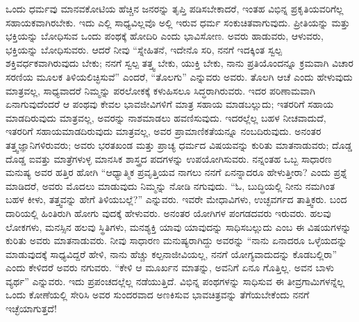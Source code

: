ಒಂದು ಧರ್ಮವು ಮಾನವಕೋಟಿಯ ಹೆಚ್ಚಿನ ಜನರನ್ನು ತೃಪ್ತಿ ಪಡಿಸಬೇಕಾದರೆ, ಇಂತಹ ವಿಭಿನ್ನ ಪ್ರಕೃತಿಯವರಿಗೆಲ್ಲ ಸಹಾಯಕವಾಗಿರಬೇಕು. ಇದು ಎಲ್ಲಿ ಸಾಧ್ಯವಿಲ್ಲವೊ ಅಲ್ಲಿ ಇರುವ ಧರ್ಮ ಸಂಕುಚಿತವಾಗುವುದು. ಪ್ರೀತಿಯನ್ನು ಮತ್ತು ಭಕ್ತಿಯನ್ನು ಬೋಧಿಸುವ ಒಂದು ಪಂಥಕ್ಕೆ ಹೋದಿರಿ ಎಂದು ಭಾವಿಸೋಣ. ಅವರು ಹಾಡುವರು, ಆಳುವರು, ಭಕ್ತಿಯನ್ನು ಬೋಧಿಸುವರು. ಆದರೆ ನೀವು “ಸ್ನೇಹಿತನೆ, ಇದೇನೊ ಸರಿ, ನನಗೆ ಇದಕ್ಕಿಂತ ಸ್ವಲ್ಪ ಶಕ್ತಿವರ್ಧಕವಾಗಿರುವುದು ಬೇಕು; ನನಗೆ ಸ್ವಲ್ಪ ತತ್ತ್ವ ಬೇಕು, ಯುಕ್ತಿ ಬೇಕು, ನಾನು ಪ್ರತಿಯೊಂದನ್ನೂ ಕ್ರಮವಾಗಿ ವಿಚಾರ ಸರಣಿಯ ಮೂಲಕ ತಿಳಿಯಲಿಚ್ಛಿಸುವೆ” ಎಂದರೆ, “ತೊಲಗು” ಎನ್ನುವರು ಅವರು. ತೊಲಗಿ ಆಚೆ ಎಂದು ಹೇಳುವುದು ಮಾತ್ರವಲ್ಲ, ಸಾಧ್ಯವಾದರೆ ನಿಮ್ಮನ್ನು ಪರಲೋಕಕ್ಕೆ ಕಳುಹಿಸಲೂ ಸಿದ್ಧರಾಗಿರುವರು. ಇದರ ಪರಿಣಾಮವಾಗಿ ಏನಾಗುವುದೆಂದರೆ ಆ ಪಂಥವು ಕೇವಲ ಭಾವಜೀವಿಗಳಿಗೆ ಮಾತ್ರ ಸಹಾಯ ಮಾಡಬಲ್ಲುದು; ಇತರರಿಗೆ ಸಹಾಯ ಮಾಡದಿರುವುದು ಮಾತ್ರವಲ್ಲ, ಅವರನ್ನು ನಾಶಮಾಡಲು ಹವಣಿಸುವುದು. ಇದರಲ್ಲೆಲ್ಲ ಬಹಳ ನೀಚವಾದುದೆ, ಇತರರಿಗೆ ಸಹಾಯಮಾಡದಿರುವುದು ಮಾತ್ರವಲ್ಲ, ಅವರ ಪ್ರಾಮಾಣಿಕತೆಯನ್ನೂ ನಂಬದಿರುವುದು. ಅನಂತರ ತತ್ತ್ವಜ್ಞಾನಿಗಳಿರುವರು; ಅವರು ಭರತಖಂಡ ಮತ್ತು ಪ್ರಾಚ್ಯ ಧರ್ಮದ ವಿಷಯವನ್ನು ಕುರಿತು ಮಾತನಾಡುವರು; ದೊಡ್ಡ ದೊಡ್ಡ ಐವತ್ತು ಮಾತ್ರೆಗಳುಳ್ಳ ಮಾನಸಿಕ ಶಾಸ್ತ್ರದ ಪದಗಳನ್ನು ಉಪಯೋಗಿಸುವರು. ನನ್ನಂತಹ ಒಬ್ಬ ಸಾಧಾರಣ ಮನುಷ್ಯ ಅವರ ಹತ್ತಿರ ಹೋಗಿ “ಆಧ್ಯಾತ್ಮಿಕ ಪ್ರವೃತ್ತಿಯವ ನಾಗಲು ನನಗೆ ಏನನ್ನಾದರೂ ಹೇಳುತ್ತೀರಾ? ಎಂದು ಪ್ರಶ್ನೆ ಮಾಡಿದರೆ, ಅವರು ಮೊದಲು ಮಾಡುವುದು ನಿಮ್ಮನ್ನು ನೋಡಿ ನಗುವುದು. “ಓ, ಬುದ್ಧಿಯಲ್ಲಿ ನೀನು ನಮಗಿಂತ ಬಹಳ ಕೀಳು, ತತ್ತ್ವವನ್ನು ಹೇಗೆ ತಿಳಿಯಬಲ್ಲೆ?” ಎನ್ನುವರು. ಇವರೇ ಮೇಧಾವಿಗಳು, ಉಚ್ಛವರ್ಗದ ತಾತ್ತ್ವಿಕರು. ಬಂದ ದಾರಿಯಲ್ಲಿ ಹಿಂತಿರುಗಿ ಹೋಗು ವುದಕ್ಕೆ ಹೇಳುವರು. ಅನಂತರ ಯೋಗಿಗಳ ಪಂಗಡದವರು ಇರುವರು. ಹಲವು ಲೋಕಗಳು, ಮನಸ್ಸಿನ ಹಲವು ಸ್ಥಿತಿಗಳು, ಮನಶ್ಯಕ್ತಿ ಯಾವು ಯಾವುದನ್ನು ಸಾಧಿಸಬಲ್ಲುದು ಎಂಬ ಈ ವಿಷಯಗಳನ್ನು ಕುರಿತು ಅವರು ಮಾತನಾಡುವರು. ನೀವು ಸಾಧಾರಣ ಮನುಷ್ಯರಾಗಿದ್ದು ಅವರನ್ನು “ನಾನು ಏನಾದರೂ ಒಳ್ಳೆಯದನ್ನು ಮಾಡುವುದಕ್ಕೆ ಸಾಧ್ಯವಿದ್ದರೆ ಹೇಳಿ, ನಾನು ಹೆಚ್ಚು ಕಲ್ಪನಾಜೀವಿಯಲ್ಲ, ನನಗೆ ಯೋಗ್ಯವಾದುದನ್ನು ಕೊಡಬಲ್ಲಿರಾ” ಎಂದು ಕೇಳಿದರೆ ಅವರು ನಗುವರು. “ಕೇಳಿ ಆ ಮೂರ್ಖನ ಮಾತನ್ನು, ಅವನಿಗೆ ಏನೂ ಗೊತ್ತಿಲ್ಲ. ಅವನ ಬಾಳು ವ್ಯರ್ಥ” ಎನ್ನುವರು. ಇದು ಪ್ರಪಂಚದಲ್ಲೆಲ್ಲ ನಡೆಯುತ್ತಿದೆ. ವಿಭಿನ್ನ ಪಂಥಗಳನ್ನು ಸಾಧಿಸುವ ಈ ತೀವ್ರಗಾಮಿಗಳನ್ನೆಲ್ಲ ಒಂದು ಕೋಣೆಯಲ್ಲಿ ಸೇರಿಸಿ ಅವರ ಸುಂದರವಾದ ಅಣಕಿಸುವ ಭಾವಚಿತ್ರವನ್ನು ತೆಗೆಯಬೇಕೆಂದು ನನಗೆ ಇಚ್ಛೆಯಾಗುತ್ತದೆ!

